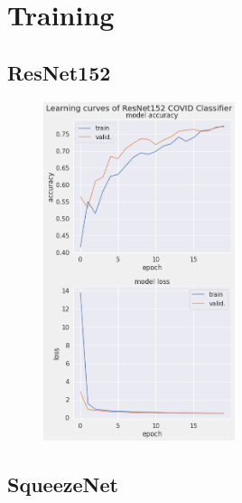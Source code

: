 \chapter{Training}
\label{ch:training}

\section{ResNet152}

\begin{figure}[H]
    \centering
    \includegraphics[width=0.5\textwidth]{../results/ResNet152_curves.png}
    \caption{}
\end{figure}

\section{SqueezeNet}

